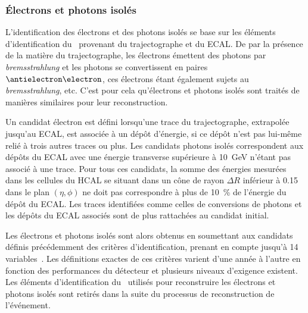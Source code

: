 \subsubsection{Électrons et photons isolés}
L'identification des électrons et des photons isolés se base sur les éléments d'identification du \PF\ provenant du trajectographe et du ECAL.
De par la présence de la matière du trajectographe, les électrons émettent des photons par \emph{bremsstrahlung} et les photons se convertissent en paires $\antielectron\electron$, ces électrons étant également sujets au \emph{bremsstrahlung}, etc.
C'est pour cela qu'électrons et photons isolés sont traités de manières similaires pour leur reconstruction.
\par Un candidat électron est défini lorsqu'une trace du trajectographe, extrapolée jusqu'au ECAL, est associée à un dépôt d'énergie, si ce dépôt n'est pas lui-même relié à trois autres traces ou plus.
Les candidats photons isolés correspondent aux dépôts du ECAL avec une énergie transverse supérieure à \SI{10}{\GeV} n'étant pas associé à une trace.
Pour tous ces candidats, la somme des énergies mesurées dans les cellules du HCAL se situant dans un cône de rayon $\Delta R$ inférieur à \num{0.15} dans le plan $(\eta,\phi)$ ne doit pas correspondre à plus de \SI{10}{\%} de l'énergie du dépôt du ECAL.
Les traces identifiées comme celles de conversions de photons et les dépôts du ECAL associés sont de plus rattachées au candidat initial.
\par Les électrons et photons isolés sont alors obtenus en soumettant aux candidats définis précédemment des critères d'identification, prenant en compte jusqu'à 14 variables~\cite{particle-flow}.
Les définitions exactes de ces critères varient d'une année à l'autre en fonction des performances du détecteur et plusieurs niveaux d'exigence existent.
Les éléments d'identification du \PF\ utilisés pour reconstruire les électrons et photons isolés sont retirés dans la suite du processus de reconstruction de l'événement.
